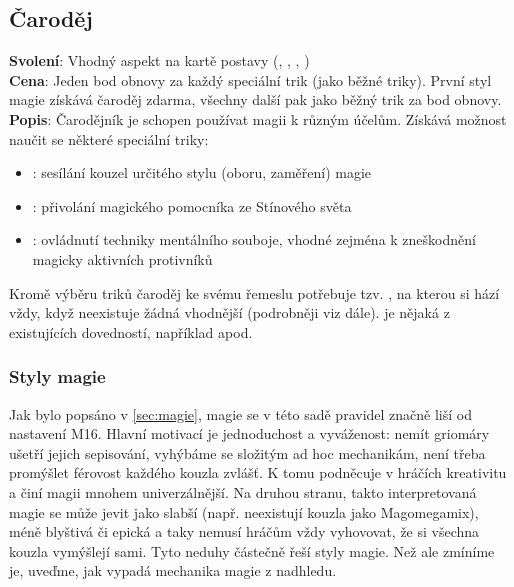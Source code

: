 \documentclass[../main.tex]{subfiles}
\begin{document}
\begin{tcolorbox}
\subsection{Čaroděj}
\label{sec:pov-carodej}
\textbf{Svolení}: Vhodný aspekt na kartě postavy (, , , )\\
\textbf{Cena}: Jeden bod obnovy za každý speciální trik (jako běžné triky). První styl magie získává čaroděj zdarma, všechny další pak jako běžný trik za bod obnovy.\\
\textbf{Popis}: Čarodějník je schopen používat magii k různým účelům. Získává možnost naučit se některé speciální triky:
\begin{itemize}
\item {}: sesílání kouzel určitého stylu (oboru, zaměření) magie
\item {}: přivolání magického pomocníka ze Stínového světa
\item {}: ovládnutí techniky mentálního souboje, vhodné zejména k zneškodnění magicky aktivních protivníků
\end{itemize}
Kromě výběru triků čaroděj ke svému řemeslu potřebuje tzv. , na kterou si hází vždy, když neexistuje žádná vhodnější (podrobněji viz dále).  je nějaká z existujících dovedností, například  apod. 
\end{tcolorbox}

\subsubsection*{Styly magie}
\label{stylymagie}

Jak bylo popsáno v \ref{sec:magie}, magie se v této sadě pravidel značně liší od nastavení M16. Hlavní motivací je jednoduchost a vyváženost: nemít griomáry ušetří jejich sepisování, vyhýbáme se složitým ad hoc mechanikám, není třeba promýšlet férovost každého kouzla zvlášť. K tomu podněcuje v hráčích kreativitu a činí magii mnohem univerzálnější. Na druhou stranu, takto interpretovaná magie se může jevit jako slabší (např. neexistují kouzla jako Magomegamix), méně blyštivá či epická a taky nemusí hráčům vždy vyhovovat, že si všechna kouzla vymýšlejí sami. Tyto neduhy částečně řeší styly magie. Než ale zmíníme je, uveďme, jak vypadá mechanika magie z nadhledu.\\
\end{document}
